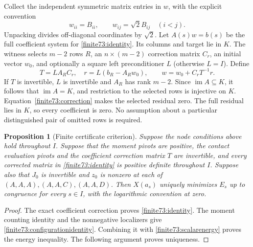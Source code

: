 \documentclass[12pt,reqno]{amsart}
\newtheorem{proposition}[theorem]{Proposition}
\theoremstyle{definition}
\numberwithin{equation}{section}
\begin{document}
Collect the independent symmetric matrix entries in $w$, with the explicit convention
\begin{equation}\label{finite73:svec}
 w_{ii}=B_{ii},\qquad w_{ij}=\sqrt2 B_{ij}\quad(i<j).
\end{equation}
Unpacking divides off-diagonal coordinates by $\sqrt2$. Let $A(s)w=b(s)$ be the full coefficient system for \eqref{finite73:identity}. Its columns and target lie in $K$. The witness selects $m-2$ rows $R$, an $n\times(m-2)$ correction matrix $C_r$, an initial vector $w_0$, and optionally a square left preconditioner $L$ (otherwise $L=I$). Define
\begin{equation}\label{finite73:correction}
 T=L A_R C_r,\quad r=L(b_R-A_Rw_0),\qquad
 w=w_0+C_rT^{-1}r.
\end{equation}
If $T$ is invertible, $L$ is invertible and $A_R$ has rank $m-2$. Since $\operatorname{im}A\subseteq K$, it follows that $\operatorname{im}A=K$, and restriction to the selected rows is injective on $K$. Equation~\eqref{finite73:correction} makes the selected residual zero. The full residual lies in $K$, so every coefficient is zero. No assumption about a particular distinguished pair of omitted rows is required.



\begin{proposition}[Finite certificate criterion]\label{finite73:obligation}
Suppose the node conditions above hold throughout $I$. Suppose that the
moment pivots are positive, the contact evaluation pivots and the
coefficient correction matrix $T$ are invertible, and every corrected
matrix in \eqref{finite73:identity} is positive definite throughout $I$.
Suppose also that $J_0$ is invertible and $z_0$ is nonzero at each of
$(A,A,A),(A,A,C),(A,A,D)$. Then $X(a_s)$ uniquely minimizes $E_s$ up to
congruence for every $s\in I$, with the logarithmic convention at zero.
\end{proposition}
\begin{proof}
The exact coefficient correction proves \eqref{finite73:identity}.
The moment counting identity and the nonnegative localizers give
\eqref{finite73:configurationidentity}. Combining it with
\eqref{finite73:scalarenergy} proves the energy inequality.
The following argument proves uniqueness.
\end{proof}
\end{document}
